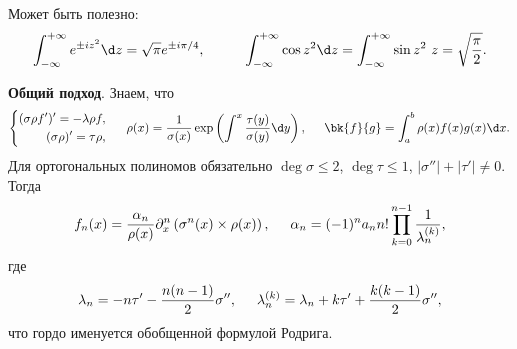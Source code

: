 
Может быть полезно:
\begin{equation*}
    \int_{-\infty}^{+\infty} e^{\pm i z^2} \d z = \sqrt{\pi} e^{\pm i \pi / 4},
    \hspace{10 mm} 
    \int_{-\infty}^{+\infty} \cos z^2 \d z = \int_{-\infty}^{+\infty} \sin z^2 \ z = \sqrt{\frac{\pi}{2}}.
\end{equation*}




\textbf{Общий подход}. 
Знаем, что
\begin{equation*}
    \left\{\begin{aligned}
        (\sigma \rho f')' = - \lambda \rho f, \\
        (\sigma \rho)' =  \tau \rho,
    \end{aligned}\right.
    \hspace{5 mm} 
    \rho(x) = \frac{1}{\sigma(x)} \exp\left(
        \int_{}^{x} \frac{\tau(y)}{\sigma(y)} \d y
    \right),
    \hspace{5 mm} 
    \bk{f}{g} = \int_{a}^{b} \rho(x) f(x) g(x) \d x.
\end{equation*}
Для ортогональных полиномов обязательно $\deg \sigma \leq 2$, $\deg \tau \leq 1$, $|\sigma''|+ |\tau'| \neq 0$. Тогда
\begin{equation*}
    f_n (x) = \frac{\alpha_n}{\rho(x)} \partial_x^n \left(\sigma^n (x) \times \rho(x)\right), \hspace{5 mm}     
    \alpha_n = (-1)^n a_n n! \prod_{k=0}^{n-1} \frac{1}{\lambda_n^{(k)}},
\end{equation*}
где 
\begin{equation*}
    \lambda_n = - n \tau' - \frac{n (n-1)}{2} \sigma'',
    \hspace{5 mm} 
    \lambda_n^{(k)} = \lambda_n + k \tau' + \frac{k (k-1)}{2} \sigma'',
\end{equation*}
что гордо именуется обобщенной формулой Родрига. 

